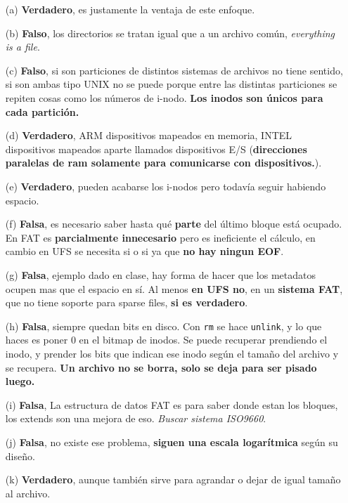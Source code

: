 \documentclass[12pt]{article}
\begin{document}
\begin{rta}
    \begin{itemize}
        \item[(a)] \textbf{Verdadero}, es justamente la ventaja de este enfoque.
        \item[(b)] \textbf{Falso}, los directorios se tratan igual que a un archivo común, \textit{everything is a file}.
        \item[(c)] \textbf{Falso}, si son particiones de distintos sistemas de archivos no tiene sentido, si son ambas tipo UNIX no se puede porque entre las distintas particiones se repiten cosas como los números de i-nodo. \textbf{Los inodos son únicos para cada partición.}
        \item[(d)] \textbf{Verdadero}, ARM dispositivos mapeados en memoria, INTEL dispositivos mapeados aparte llamados dispositivos E/S (\textbf{direcciones paralelas de ram solamente para comunicarse con dispositivos.}).
        \item[(e)] \textbf{Verdadero}, pueden acabarse los i-nodos pero todavía seguir habiendo espacio.
        \item[(f)] \textbf{Falsa}, es necesario saber hasta qué \textbf{parte} del último bloque está {ocupado}.  En FAT es \textbf{parcialmente innecesario} pero es ineficiente el cálculo, en cambio en UFS se necesita si o si ya que \textbf{no hay ningun EOF}.
        \item[(g)] \textbf{Falsa}, ejemplo dado en clase, hay forma de hacer que los metadatos ocupen mas que el espacio en sí. Al menos \textbf{en UFS no}, en un \textbf{sistema FAT}, que no tiene soporte para sparse files, \textbf{si es verdadero}.
        \item[(h)] \textbf{Falsa}, siempre quedan bits en disco. Con \texttt{rm} se hace \texttt{unlink}, y lo que haces es poner 0 en el bitmap de inodos. Se puede recuperar prendiendo el inodo, y prender los bits que indican ese inodo según el tamaño del archivo y se recupera. \textbf{Un archivo no se borra, solo se deja para ser pisado luego.}
        \item[(i)] \textbf{Falsa}, La estructura de datos FAT es para saber donde estan los bloques, los extends son una mejora de eso. \textit{Buscar sistema ISO9660}.
        \item[(j)] \textbf{Falsa}, no existe ese problema, \textbf{siguen una escala logarítmica} según su diseño.
        \item[(k)] \textbf{Verdadero}, aunque también sirve para agrandar o dejar de igual tamaño al archivo.
    \end{itemize}
\end{rta}
\end{document}
